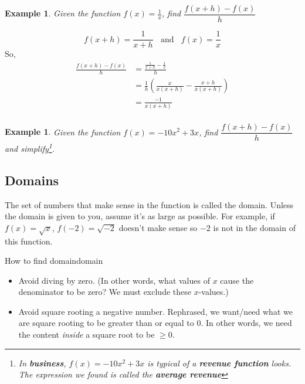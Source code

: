 \documentclass[twoside]{tufte-handout}
\newcounter{ekcounter}%
\theoremstyle{ekimcustom}
\newtheorem{exm}[ekcounter]{Example}
\begin{document}
\begin{exm}
Given the function $f(x)=\frac{1}{x}$, find $\dfrac{f(x+h)-f(x)}{h}$
\end{exm}
$$f(x+h)=\frac{1}{x+h} ~~~~\mbox{and}~~~~ f(x)=\frac{1}{x}$$ 
So, 
\begin{align*}
\frac{f(x+h)-f(x)}{h}&=\frac{\frac{1}{x+h}-\frac{1}{x}}{h}\\   
	&=\frac{1}{h}\left(\frac{x}{x(x+h)}-\frac{x+h}{x(x+h)}\right)\\
 &=\frac{-1}{x(x+h)}\\
\end{align*}

\vskip10pt

\everymath{\displaystyle}



\begin{exm}Given the function $f(x)=-10x^2+3x$, find $\dfrac{f(x+h)-f(x)}{h}$ and simplify\footnote{In {\bf business}, $f(x)=-10x^2+3x$ is typical of a {\bf revenue function} looks. The expression we found is called the {\bf average revenue}}. 
\end{exm}\vskip10pt





\subsection{Domains}
  The set of numbers that make sense in the function is called the domain. 
 Unless the domain is given to you, assume it's as large as possible.  
 For example, if $f(x)=\sqrt{x}$,  $f(-2)=\sqrt{-2}$ doesn't make sense so $-2$ is not in the domain of this function.  

\begin{bmethod}{How to find domain}{domain}
\begin{itemize}
\item Avoid diving by zero. (In other words, what values of $x$ cause the denominator to be zero? We must exclude these $x$-values.)
\item Avoid square rooting a negative number. Rephrased, we want/need what we are square rooting to be greater than or equal to $0$. In other words, we need the content \emph{inside} a square root to be $\geq0$.
\end{itemize}
\end{bmethod}
\end{document}
